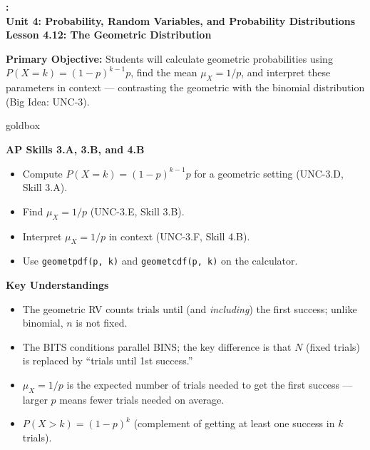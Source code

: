\documentclass[10pt]{article}
\newcommand{\UnitNumberName}{Unit 4: Probability, Random Variables, and Probability Distributions \quad}
\newcommand{\LessonNumberName}{Lesson 4.12: The Geometric Distribution}
\begin{document}
\begin{center}
    {\Large\bfseries \CourseName: \SchoolYear \\
    {\small\bfseries \UnitNumberName \LessonNumberName}}
\end{center}

\begin{tcolorbox}[colback=sky, colframe=navy, boxrule=0.9pt, arc=2mm,
    left=2mm, right=2mm, top=1.5mm, bottom=1.5mm]
    \textbf{Primary Objective:} Students will calculate geometric probabilities
    using $P(X = k) = (1-p)^{k-1}p$, find the mean $\mu_X = 1/p$, and interpret
    these parameters in context --- contrasting the geometric with the binomial
    distribution (Big Idea: UNC-3).
\end{tcolorbox}

\renewcommand{\arraystretch}{1.6}
\begin{skillbox}{goldbox}
\begin{minipage}[t]{0.48\linewidth}
    \textbf{AP Skills 3.A, 3.B, and 4.B}
    \begin{itemize}
        \item Compute $P(X = k) = (1-p)^{k-1}p$ for a geometric setting
              (UNC-3.D, Skill 3.A).
        \item Find $\mu_X = 1/p$ (UNC-3.E, Skill 3.B).
        \item Interpret $\mu_X = 1/p$ in context (UNC-3.F, Skill 4.B).
        \item Use \texttt{geometpdf(p, k)} and \texttt{geometcdf(p, k)} on the
              calculator.
    \end{itemize}
\end{minipage}
\hfill
\begin{minipage}[t]{0.48\linewidth}
    \textbf{Key Understandings}
    \begin{itemize}
        \item The geometric RV counts trials until (and \emph{including}) the
              first success; unlike binomial, $n$ is not fixed.
        \item The BITS conditions parallel BINS; the key difference is that $N$
              (fixed trials) is replaced by ``trials until 1st success.''
        \item $\mu_X = 1/p$ is the expected number of trials needed to get the
              first success --- larger $p$ means fewer trials needed on average.
        \item $P(X > k) = (1-p)^k$ (complement of getting at least one success
              in $k$ trials).
    \end{itemize}
\end{minipage}
\end{skillbox}
\end{document}
